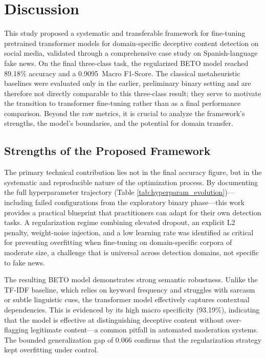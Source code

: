 \documentclass[informatics,article,accept,pdftex,moreauthors]{Definitions/mdpi}
\begin{document}
\section{Discussion}

This study proposed a systematic and transferable framework for fine-tuning pretrained transformer models for domain-specific deceptive content detection on social media, validated through a comprehensive case study on Spanish-language fake news. On the final three-class task, the regularized BETO model reached 89.18\% accuracy and a \mbox{0.9095 Macro} F1-Score. The classical metaheuristic baselines were evaluated only in the earlier, preliminary binary setting and are therefore not directly comparable to this three-class result; they serve to motivate the transition to transformer fine-tuning rather than as a final performance comparison. Beyond the raw metrics, it is crucial to analyze the framework's strengths, the model's boundaries, and the potential for domain transfer.

\subsection{Strengths of the Proposed Framework}
The primary technical contribution lies not in the final accuracy figure, but in the systematic and reproducible nature of the optimization process. By documenting the full hyperparameter trajectory (Table \ref{tab:hyperparam_evolution})—including failed configurations from the exploratory binary phase—this work provides a practical blueprint that practitioners can adapt for their own detection tasks. A regularization regime combining elevated dropout, an explicit L2 penalty, weight-noise injection, and a low learning rate was identified as critical for preventing overfitting when fine-tuning on domain-specific corpora of moderate size, a challenge that is universal across detection domains, not specific to fake news.

The resulting BETO model demonstrates strong semantic robustness. Unlike the TF-IDF baseline, which relies on keyword frequency and struggles with sarcasm or subtle linguistic cues, the transformer model effectively captures contextual dependencies. This is evidenced by its high macro specificity (93.19\%), indicating that the model is effective at distinguishing deceptive content without over-flagging legitimate content—a common pitfall in automated moderation systems. The bounded generalization gap of 0.066 confirms that the regularization strategy kept overfitting under control.
\end{document}
